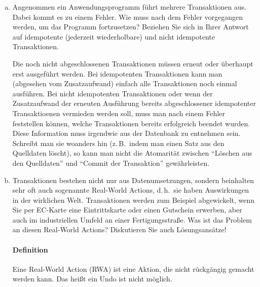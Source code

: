 \begin{enumerate}[a)]
	\begin{solution}
	Physische Konsistenz: Korrektheit von Speicherungsstrukturen: Alle Verweise und Adressen (TIDs) stimmen. Alle Indexe sind vollständig und stimmen mit den Primärdaten überein.

	Logische Konsistenz: Korrektheit der Dateninhalte: Stellen einen (möglichen) Zustand der realen Welt dar. Alle Bedingungen des Datenmodells (Pri"-mär"-schlüs"-sel"-ei"-gen"-schaft, Referenzielle Integrität) und alle benutzerdefinierten Bedingungen (Assertions) sind erfüllt.
	\end{solution}

	\item Angenommen ein Anwendungsprogramm führt mehrere Transaktionen aus. Dabei kommt es zu einem Fehler. Wie muss nach dem Fehler vorgegangen werden, um das Programm fortzusetzen? Beziehen Sie sich in Ihrer Antwort auf idempotente (jederzeit wiederholbare) und nicht idempotente Transaktionen.

	\begin{solution}
	Die noch nicht abgeschlossenen Transaktionen müssen erneut oder überhaupt erst ausgeführt werden.
	Bei idempotenten Transaktionen kann man (abgesehen vom Zusatzaufwand) einfach alle Transaktionen noch einmal ausführen.
	Bei nicht idempotenten Transaktionen oder wenn der Zusatzaufwand der erneuten Ausführung bereits abgeschlossener idempotenter Transaktioenen vermieden werden soll, muss man nach einem Fehler feststellen können, welche Transaktionen bereits erfolgreich beendet wurden. Diese Information muss irgendwie aus der Datenbank zu entnehmen sein. Schreibt man sie woanders hin (z.\,B.\ indem man einen Satz aus den Quelldaten löscht), so kann man nicht die Atomarität zwischen "`Löschen aus den Quelldaten"' und "`Commit der Transaktion"' gewährleisten.
	\end{solution}

	\item Transaktionen bestehen nicht nur aus Datenumsetzungen, sondern beinhalten sehr oft auch sogenannte Real-World Actions, d.\,h.\ sie haben Auswirkungen in der wirklichen Welt. Transaktionen werden zum Beispiel abgewickelt, wenn Sie per EC-Karte eine Eintrittskarte oder einen Gutschein erwerben, aber auch im industriellen Umfeld an einer Fertigungsstraße. Was ist das Problem an diesen Real-World Actions? Diskutieren Sie auch Lösungsansätze!

	\begin{solution}
	\paragraph{\color{solutioncolor}Definition} Eine Real-World Action (RWA) ist eine Aktion, die nicht rückgängig gemacht werden kann. Das heißt ein Undo ist nicht möglich.


\end{solution}
\end{enumerate}
